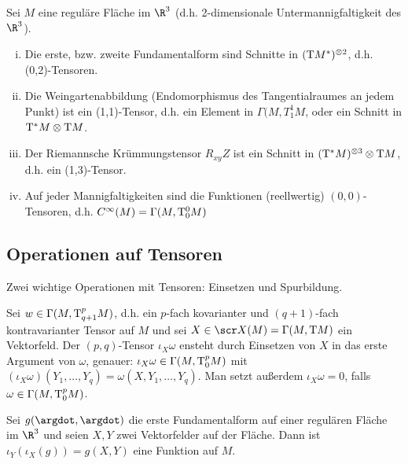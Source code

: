 \begin{ex*}
    Sei $M$ eine reguläre Fläche im $\R^3$ (d.h. 2-dimensionale Untermannigfaltigkeit des $\R^3$).
    \begin{enumerate}[(i)]
        \item
            Die erste, bzw. zweite Fundamentalform sind Schnitte in $(\mathrm{T} M^*)^{\otimes 2}$, d.h. (0,2)-Tensoren.
        \item
            Die Weingartenabbildung (Endomorphismus des Tangentialraumes an jedem Punkt) ist ein (1,1)-Tensor, d.h. ein Element in $\Gamma(M, T_1^1 M$, oder ein Schnitt in $\mathrm{T}^* M \otimes \mathrm{T} M$.
        \item
            Der Riemannsche Krümmungstensor $R_{xy} Z$ ist ein Schnitt in $(\mathrm{T}^* M)^{\otimes 3} \otimes \mathrm{T} M$, d.h. ein (1,3)-Tensor.
        \item
            Auf jeder Mannigfaltigkeiten sind die Funktionen (reellwertig) $(0,0)$-Tensoren, d.h. $C^\infty(M) = \Gamma(M, \mathrm{T}_0^0 M)$
    \end{enumerate}
\end{ex*}


\subsection{Operationen auf Tensoren}

Zwei wichtige Operationen mit Tensoren: Einsetzen und Spurbildung.

\begin{df} \label{5.15}
    Sei $w \in \Gamma(M, \mathrm{T}^p_{q+1} M)$, d.h. ein $p$-fach kovarianter und $(q+1)$-fach kontravarianter Tensor auf $M$ und sei $X \in \scr X(M) = \Gamma(M, \T M)$ ein Vektorfeld.
    Der $(p,q)$-Tensor $\iota_X \omega$ ensteht durch Einsetzen von $X$  in das erste Argument von $\omega$, genauer: $\iota_X \omega \in \Gamma(M, \mathrm{T}_0^p M)$ mit
    \begin{math}
        (\iota_X \omega)(Y_1, \dotsc, Y_q) = \omega(X, Y_1, \dotsc, Y_q).
    \end{math}
    Man setzt außerdem $\iota_X \omega = 0$, falls $\omega \in \Gamma(M, \mathrm{T}_0^p M)$.
\end{df}

\begin{ex*}
    Sei $g(\argdot, \argdot)$ die erste Fundamentalform auf einer regulären Fläche im $\R^3$ und seien $X, Y$ zwei Vektorfelder auf der Fläche.
    Dann ist $\iota_Y(\iota_X(g)) = g(X,Y)$ eine Funktion auf $M$.
\end{ex*}

